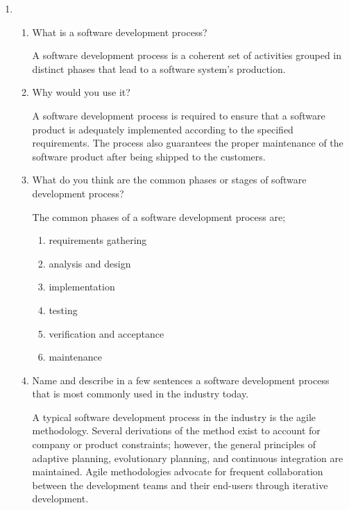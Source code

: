 \documentclass{article}
\begin{document}
  \begin{enumerate}[resume]

    \item
    \begin{enumerate}
      \item What is a software development process?

      A software development process is a coherent set of activities grouped in distinct phases that lead to a software system's production.

      \item Why would you use it?

      A software development process is required to ensure that a software product is adequately implemented according to the specified requirements. The process also guarantees the proper maintenance of the software product after being shipped to the customers.

      \item What do you think are the common phases or stages of software development process?

      The common phases of a software development process are;
      \begin{enumerate}
        \item requirements gathering
        \item analysis and design
        \item implementation
        \item testing
        \item verification and acceptance
        \item maintenance
      \end{enumerate}

      \item Name and describe in a few sentences a software development process that is most commonly used in the industry today.

      A typical software development process in the industry is the agile methodology. Several derivations of the method exist to account for company or product constraints; however, the general principles of adaptive planning, evolutionary planning, and continuous integration are maintained. Agile methodologies advocate for frequent collaboration between the development teams and their end-users through iterative development.

    \end{enumerate}
  \end{enumerate}
\end{document}
